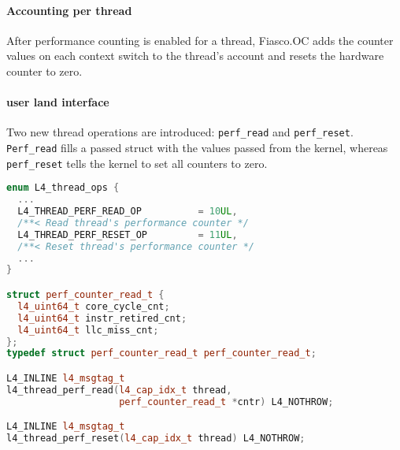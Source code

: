 \paragraph{Accounting per thread}
After performance counting is enabled for a thread,
Fiasco.OC adds the counter values on each context switch to the thread's
account and resets the hardware counter to zero.


\paragraph{user land interface}
Two new thread operations are introduced: \texttt{perf\_read} and
\texttt{perf\_reset}.
\texttt{Perf\_read} fills a passed struct with the values passed from the
kernel, whereas \texttt{perf\_reset} tells the kernel to set all counters to zero.

\begin{lstlisting}[language=c++]
enum L4_thread_ops {
  ...
  L4_THREAD_PERF_READ_OP	      = 10UL,
  /**< Read thread's performance counter */
  L4_THREAD_PERF_RESET_OP	      =	11UL,
  /**< Reset thread's performance counter */
  ...
}

struct perf_counter_read_t {
  l4_uint64_t core_cycle_cnt;
  l4_uint64_t instr_retired_cnt;
  l4_uint64_t llc_miss_cnt;
};
typedef struct perf_counter_read_t perf_counter_read_t;

L4_INLINE l4_msgtag_t
l4_thread_perf_read(l4_cap_idx_t thread,
                    perf_counter_read_t *cntr) L4_NOTHROW;

L4_INLINE l4_msgtag_t
l4_thread_perf_reset(l4_cap_idx_t thread) L4_NOTHROW;
\end{lstlisting}
